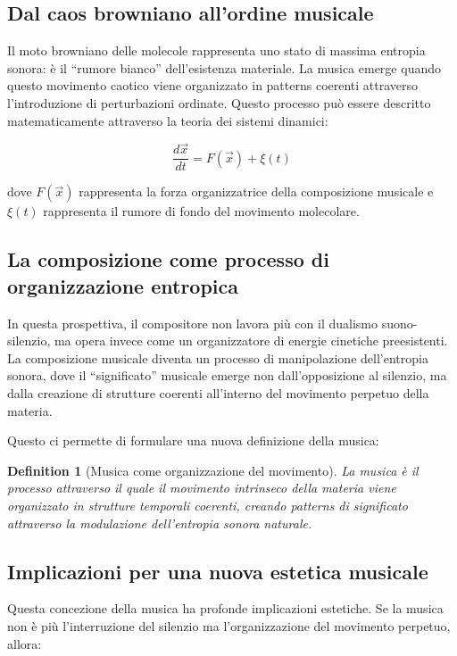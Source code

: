 \documentclass{gs-adonis}
\begin{document}
\subsection{Dal caos browniano all'ordine
musicale}\label{dal-caos-browniano-allordine-musicale}

Il moto browniano delle molecole rappresenta uno stato di massima
entropia sonora: è il ``rumore bianco'' dell'esistenza materiale. La
musica emerge quando questo movimento caotico viene organizzato in
patterns coerenti attraverso l'introduzione di perturbazioni ordinate.
Questo processo può essere descritto matematicamente attraverso la
teoria dei sistemi dinamici:

\[\frac{d\vec{x}}{dt} = F(\vec{x}) + \xi(t)\]

dove \(F(\vec{x})\) rappresenta la forza organizzatrice della
composizione musicale e \(\xi(t)\) rappresenta il rumore di fondo del
movimento molecolare.

\subsection{La composizione come processo di organizzazione
entropica}\label{la-composizione-come-processo-di-organizzazione-entropica}

In questa prospettiva, il compositore non lavora più con il dualismo
suono-silenzio, ma opera invece come un organizzatore di energie
cinetiche preesistenti. La composizione musicale diventa un processo di
manipolazione dell'entropia sonora, dove il ``significato'' musicale
emerge non dall'opposizione al silenzio, ma dalla creazione di strutture
coerenti all'interno del movimento perpetuo della materia.

Questo ci permette di formulare una nuova definizione della musica:

\textbf{Definition 1} (Musica come organizzazione del movimento).
\emph{La musica è il processo attraverso il quale il movimento
intrinseco della materia viene organizzato in strutture temporali
coerenti, creando patterns di significato attraverso la modulazione
dell'entropia sonora naturale.}

\subsection{Implicazioni per una nuova estetica
musicale}\label{implicazioni-per-una-nuova-estetica-musicale}

Questa concezione della musica ha profonde implicazioni estetiche. Se la
musica non è più l'interruzione del silenzio ma l'organizzazione del
movimento perpetuo, allora:
\end{document}
